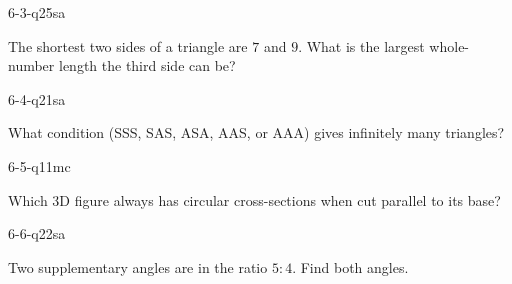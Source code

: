 \begin{practiceQuestion}{6-3-q25}{sa}
\begin{questionText}
The shortest two sides of a triangle are $7$ and $9$. What is the largest whole-number length the third side can be?
\end{questionText}
\end{practiceQuestion}

\begin{practiceQuestion}{6-4-q21}{sa}
\begin{questionText}
What condition (SSS, SAS, ASA, AAS, or AAA) gives infinitely many triangles?
\end{questionText}
\end{practiceQuestion}

\begin{practiceQuestion}{6-5-q11}{mc}
\begin{questionText}
Which 3D figure always has circular cross-sections when cut parallel to its base?
\end{questionText}
\end{practiceQuestion}

\begin{practiceQuestion}{6-6-q22}{sa}
\begin{questionText}
Two supplementary angles are in the ratio $5:4$. Find both angles.
\end{questionText}
\end{practiceQuestion}

